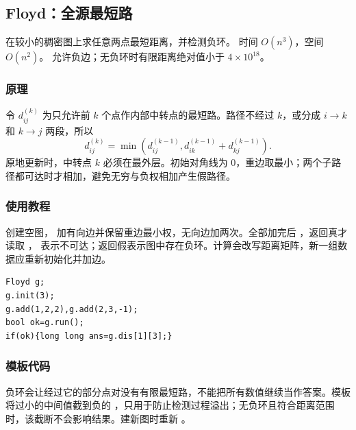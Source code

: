 \subsection{Floyd：全源最短路}
\label{algo:floyd}
\AlgorithmInfo
    {在较小的稠密图上求任意两点最短距离，并检测负环。}
    {时间 $O(n^3)$，空间 $O(n^2)$。}
    {允许负边；无负环时有限距离绝对值小于 $4\times10^{18}$。}

\subsubsection*{原理}
令 $d^{(k)}_{ij}$ 为只允许前 $k$ 个点作内部中转点的最短路。路径不经过 $k$，或分成 $i\to k$ 和 $k\to j$ 两段，所以
\[
    d^{(k)}_{ij}=\min(d^{(k-1)}_{ij},d^{(k-1)}_{ik}+d^{(k-1)}_{kj}).
\]
原地更新时，中转点 $k$ 必须在最外层。初始对角线为 $0$，重边取最小；两个子路径都可达时才相加，避免无穷与负权相加产生假路径。

\subsubsection*{使用教程}
 创建空图， 加有向边并保留重边最小权，无向边加两次。全部加完后 ，返回真才读取 ， 表示不可达；返回假表示图中存在负环。计算会改写距离矩阵，新一组数据应重新初始化并加边。
\begin{lstlisting}[style=mtycpp,numbers=none]
Floyd g;
g.init(3);
g.add(1,2,2),g.add(2,3,-1);
bool ok=g.run();
if(ok){long long ans=g.dis[1][3];}
\end{lstlisting}

\subsubsection*{模板代码}

负环会让经过它的部分点对没有有限最短路，不能把所有数值继续当作答案。模板将过小的中间值截到负的 ，只用于防止检测过程溢出；无负环且符合距离范围时，该截断不会影响结果。建新图时重新 。
